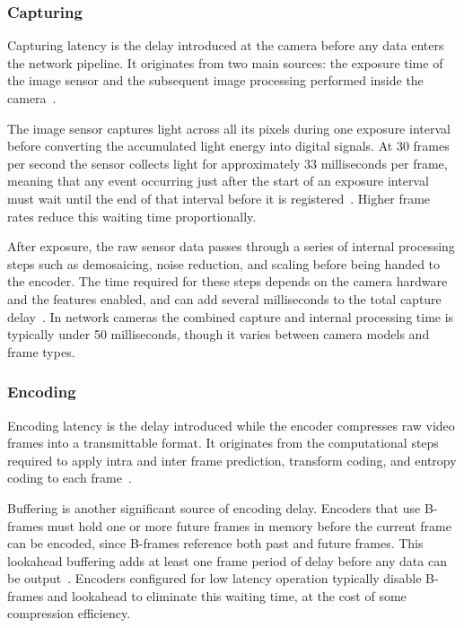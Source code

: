 \subsubsection{Capturing}\label{subsec:capturing}
Capturing latency is the delay introduced at the camera before any data enters the network pipeline. It originates from two main sources: the exposure time of the image sensor and the subsequent image processing performed inside the camera~\cite{axis2024}.
 
The image sensor captures light across all its pixels during one exposure interval before converting the accumulated light energy into digital signals. At 30 frames per second the sensor collects light for approximately 33 milliseconds per frame, meaning that any event occurring just after the start of an exposure interval must wait until the end of that interval before it is registered~\cite{axis2024}. Higher frame rates reduce this waiting time proportionally.
 
After exposure, the raw sensor data passes through a series of internal processing steps such as demosaicing, noise reduction, and scaling before being handed to the encoder. The time required for these steps depends on the camera hardware and the features enabled, and can add several milliseconds to the total capture delay~\cite{axis2024, kaknjo2018}. In network cameras the combined capture and internal processing time is typically under 50 milliseconds, though it varies between camera models and frame types.

 
\subsubsection{Encoding}\label{subsec:encoding}
Encoding latency is the delay introduced while the encoder compresses raw video frames into a transmittable format. It originates from the computational steps required to apply intra and inter frame prediction, transform coding, and entropy coding to each frame~\cite{axis2024}.
 
Buffering is another significant source of encoding delay. Encoders that use B-frames must hold one or more future frames in memory before the current frame can be encoded, since B-frames reference both past and future frames. This lookahead buffering adds at least one frame period of delay before any data can be output~\cite{hamidouche2022}. Encoders configured for low latency operation typically disable B-frames and lookahead to eliminate this waiting time, at the cost of some compression efficiency.
 
